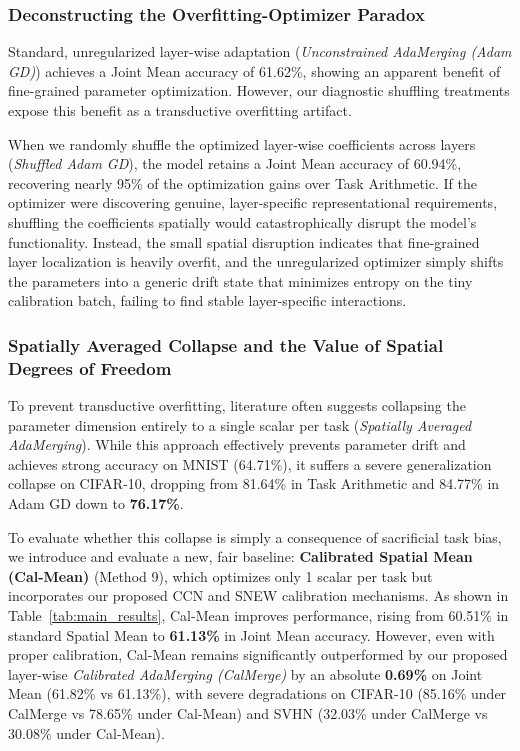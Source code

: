 \subsubsection{Deconstructing the Overfitting-Optimizer Paradox}
Standard, unregularized layer-wise adaptation (\emph{Unconstrained AdaMerging (Adam GD)}) achieves a Joint Mean accuracy of 61.62\%, showing an apparent benefit of fine-grained parameter optimization. However, our diagnostic shuffling treatments expose this benefit as a transductive overfitting artifact. 

When we randomly shuffle the optimized layer-wise coefficients across layers (\emph{Shuffled Adam GD}), the model retains a Joint Mean accuracy of 60.94\%, recovering nearly 95\% of the optimization gains over Task Arithmetic. If the optimizer were discovering genuine, layer-specific representational requirements, shuffling the coefficients spatially would catastrophically disrupt the model's functionality. Instead, the small spatial disruption indicates that fine-grained layer localization is heavily overfit, and the unregularized optimizer simply shifts the parameters into a generic drift state that minimizes entropy on the tiny calibration batch, failing to find stable layer-specific interactions.

\subsubsection{Spatially Averaged Collapse and the Value of Spatial Degrees of Freedom}
To prevent transductive overfitting, literature often suggests collapsing the parameter dimension entirely to a single scalar per task (\emph{Spatially Averaged AdaMerging}). While this approach effectively prevents parameter drift and achieves strong accuracy on MNIST (64.71\%), it suffers a severe generalization collapse on CIFAR-10, dropping from 81.64\% in Task Arithmetic and 84.77\% in Adam GD down to \textbf{76.17\%}.

To evaluate whether this collapse is simply a consequence of sacrificial task bias, we introduce and evaluate a new, fair baseline: \textbf{Calibrated Spatial Mean (Cal-Mean)} (Method 9), which optimizes only 1 scalar per task but incorporates our proposed CCN and SNEW calibration mechanisms. As shown in Table~\ref{tab:main_results}, Cal-Mean improves performance, rising from 60.51\% in standard Spatial Mean to \textbf{61.13\%} in Joint Mean accuracy. However, even with proper calibration, Cal-Mean remains significantly outperformed by our proposed layer-wise \emph{Calibrated AdaMerging (CalMerge)} by an absolute \textbf{0.69\%} on Joint Mean (61.82\% vs 61.13\%), with severe degradations on CIFAR-10 (85.16\% under CalMerge vs 78.65\% under Cal-Mean) and SVHN (32.03\% under CalMerge vs 30.08\% under Cal-Mean).

